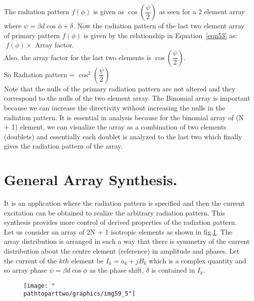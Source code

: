 The radiation pattern $f(\phi)$ is given as $\cos(\dfrac{\psi}{2})$ as seen for a 2 element array where $\psi = \beta d\cos\phi + \delta$. Now the radiation pattern of the last two element array of primary pattern $f(\phi)$ is given by the relationship in Equation~\ref{eqn53} as:   $\; f(\phi) \times$ Array factor. \\
Also, the array factor for the last two elements is $\cos(\dfrac{\psi}{2})$.\\
So Radiation pattern = $\cos^2(\dfrac{\psi}{2})$\\
Note that the nulls of the primary radiation pattern are not altered and they correspond to the nulls of the two element array. The Binomial array is important because we can increase the directivity without increasing the nulls in the radiation pattern. It is essential in analysis because for the binomial array of (N + 1) element, we can visualize the array as a combination of two elements (doublets) and essentially each doublet is analyzed to the last two which finally gives the radiation pattern of the array.

\section{General Array Synthesis.}
It is an application where the radiation pattern is specified and then the current excitation can be obtained to realize the arbitrary radiation pattern. This synthesis provides more control of derived properties of the radiation pattern.\\
Let us consider an array of 2N + 1 isotropic elements as shown in fig.\ref{fig:fig-4}. The array distribution is arranged in such a way that there is symmetry of the current distribution about the centre element (reference) in amplitude and phases. Let the current of the $kth$ element be $I_k =a_k + jB_k$ which is a complex quantity and so array phase $\psi =\beta d\cos\phi$ as the phase shift, $\delta$ is contained in $I_k$.
\begin{figure}[h]
\centering
\texttt{[image: "\\pathtoparttwo/graphics/img59\_5"]}
\caption{}
\label{fig:fig-4}
\end{figure}

